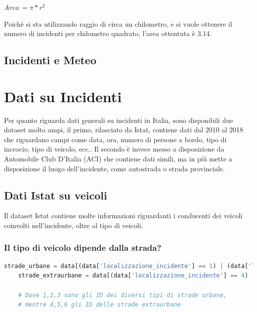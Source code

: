 \documentclass[a4paper]{report}
\begin{document}
\begin{center}
    $Area\, = \pi * r^2$
\end{center}

Poichè si sta utilizzando raggio di circa un chilometro, e si vuole ottenere il numero di incidenti per chilometro 
quadrato, l'area ottentuta è 3.14.

\section{Incidenti e Meteo}

\chapter{Dati su Incidenti}

Per quanto riguarda dati generali su incidenti in Italia, sono disponibili due dataset molto ampi, 
il primo, rilasciato da Istat, contiene dati dal 2010 al 2018 che riguardano campi come data, ora, 
numero di persone a bordo, tipo di incrocio, tipo di veicolo, ecc..
Il secondo è invece messo a disposizione da Automobile Club D'Italia (ACI) che contiene dati simili, 
ma in più mette a disposizione il luogo dell'incidente, come autostrada o strada provinciale.

\section{Dati Istat su veicoli}

Il dataset Istat contiene molte informazioni riguardanti i conducenti dei veicoli coinvolti 
nell'incidente, oltre al tipo di veicoli.

\subsection{Il tipo di veicolo dipende dalla strada?}


\begin{lstlisting}[language=Python]
    strade_urbane = data[(data['localizzazione_incidente'] == 1) | (data['localizzazione_incidente'] == 2) | (data['localizzazione_incidente'] == 3)]['tipo_veicolo_a']
    strade_extraurbane = data[(data['localizzazione_incidente'] == 4) | (data['localizzazione_incidente'] == 5) | (data['localizzazione_incidente'] == 6)]['tipo_veicolo_a']

    # Dove 1,2,3 sono gli ID dei diversi tipi di strade urbane, 
    # mentre 4,5,6 gli ID delle strade extraurbane
\end{lstlisting}
\end{document}

